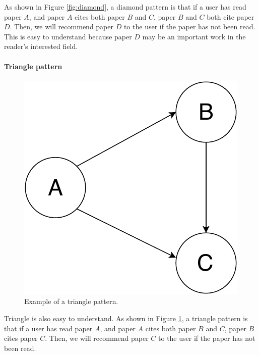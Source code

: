 As shown in Figure \ref{fig:diamond}, a diamond pattern is that if a user has read paper $A$, and paper $A$ cites both paper $B$ and $C$, paper $B$ and $C$ both cite paper $D$. Then, we will recommend paper $D$ to the user if the paper has not been read. This is easy to understand because paper $D$ may be an important work in the reader's interested field.

\paragraph{Triangle pattern}

\begin{figure}[t]
	\centering
	\includegraphics[width=0.5\linewidth]{triangle}
	\caption{Example of a triangle pattern.}
	\label{fig:triangle}
\end{figure}

Triangle is also easy to understand. As shown in Figure \ref{fig:triangle}, a triangle pattern is that if a user has read paper $A$, and paper $A$ cites both paper $B$ and $C$, paper $B$ cites paper $C$. Then, we will recommend paper $C$ to the user if the paper has not been read. 

